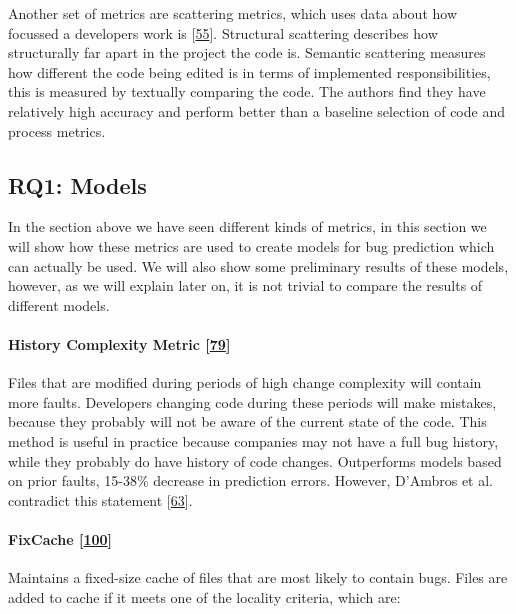 \documentclass[]{book}
\let\oldparagraph\paragraph
\renewcommand{\paragraph}[1]{\oldparagraph{#1}\mbox{}}
\begin{document}
Another set of metrics are scattering metrics, which uses data about how
focussed a developers work is
{[}\protect\hyperlink{ref-DiNucci2018}{55}{]}. Structural scattering
describes how structurally far apart in the project the code is.
Semantic scattering measures how different the code being edited is in
terms of implemented responsibilities, this is measured by textually
comparing the code. The authors find they have relatively high accuracy
and perform better than a baseline selection of code and process
metrics.

\subsection{RQ1: Models}\label{rq1-models}

In the section above we have seen different kinds of metrics, in this
section we will show how these metrics are used to create models for bug
prediction which can actually be used. We will also show some
preliminary results of these models, however, as we will explain later
on, it is not trivial to compare the results of different models.

\paragraph{\texorpdfstring{History Complexity Metric
{[}\protect\hyperlink{ref-hassan2009}{79}{]}}{History Complexity Metric {[}79{]}}}\label{history-complexity-metric-hassan2009}

Files that are modified during periods of high change complexity will
contain more faults. Developers changing code during these periods will
make mistakes, because they probably will not be aware of the current
state of the code. This method is useful in practice because companies
may not have a full bug history, while they probably do have history of
code changes. Outperforms models based on prior faults, 15-38\% decrease
in prediction errors. However, D'Ambros et al. contradict this statement
{[}\protect\hyperlink{ref-DAmbros2010}{63}{]}.

\paragraph{\texorpdfstring{FixCache
{[}\protect\hyperlink{ref-kim2007}{100}{]}}{FixCache {[}100{]}}}\label{fixcache-kim2007}

Maintains a fixed-size cache of files that are most likely to contain
bugs. Files are added to cache if it meets one of the locality criteria,
which are:
\end{document}
